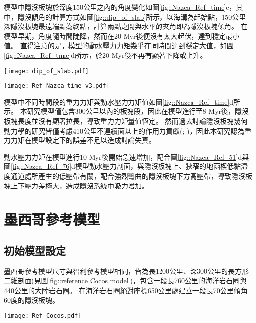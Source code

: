 模型中隱沒板塊於深度150公里之內的角度變化如圖\ref{fig::Nazca_Ref_time}c，其中，隱沒傾角的計算方式如圖\ref{fig::dip_of_slab}所示，以海溝為起始點，150公里深隱沒板塊最遠端點為終點，計算兩點之間與水平的夾角即為隱沒板塊傾角。
在模型早期，角度隨時間陡降，然而在20 Myr後便沒有太大起伏，達到穩定最小值。
直得注意的是，模型的動水壓力力矩幾乎在同時間達到穩定大值，如圖\ref{fig::Nazca_Ref_time}d所示，於20 Myr後不再有顯著下降或上升。

\begin{figure*}[h]
    \centering
    \texttt{[image: dip\_of\_slab.pdf]}
    \caption[本研究中隱沒傾角的計算方式]{本研究中隱沒傾角的計算方式。}
    \label{fig::dip_of_slab}
\end{figure*}

\begin{figure*}[ht!]
    \centering
    \texttt{[image: Ref\_Nazca\_time\_v3.pdf]}
    \caption[智利參考模型隱沒板塊狀態隨時間變化]{智利參考模型隱沒板塊狀態隨時間變化。灰底為模型中之平坦隱沒時期。(a)參考模型平坦段長度隨時間變化(b)參考模型平坦段深度隨時間變化，灰虛線為\citealp{Manea2017}中提及之智利平坦隱沒平坦段深度約落在100公里深，淺藍色底框出95公里至105公里範圍。(c)參考模型隱沒板塊自海溝到深度150公里之傾角。(d)參考模型中重力力矩與吸力力矩隨時間變化。其中粉紅色線為重力力矩，深藍色線為吸力力矩。兩者皆有做1 Myr的移動平均。}
    \label{fig::Nazca_Ref_time}
\end{figure*}

模型中不同時間段的重力力矩與動水壓力力矩值如圖\ref{fig::Nazca_Ref_time}d所示。
本研究模型僅包含300公里以內的板塊段，因此在模型進行至8 Myr後，隱沒板塊長度並沒有顯著拉長，導致重力力矩量值恆定。
然而過去討論隱沒板塊幾何動力學的研究皆僅考慮410公里不連續面以上的作用力貢獻(\citealp{schellart2004quantifying}; \citealp{billen2008modeling})，因此本研究認為重力力矩在模型設定下的誤差不足以造成討論失真。

動水壓力力矩在模型進行10 Myr後開始急速增加，配合圖\ref{fig::Nazca_Ref_51}d與圖\ref{fig::Nazca_Ref_76}d模型動水壓力剖面，與隱沒板塊上、狹窄的地函楔低黏滯度通道處所產生的低壓帶有關，配合強烈彎曲的隱沒板塊下方高壓帶，導致隱沒板塊上下壓力差極大，造成隱沒系統中吸力增加。

\newpage
\section{墨西哥參考模型}
\subsection{初始模型設定}
墨西哥參考模型尺寸與智利參考模型相同，皆為長1200公里、深300公里的長方形二維剖面(見圖\ref{fig::reference Cocos model})，包含一段長760公里的海洋岩石圈與440公里的大陸岩石圈。
在海洋岩石圈絕對座標650公里處建立一段長70公里傾角60度的隱沒板塊。
\begin{figure*}[ht!]
    \centering
    \texttt{[image: Ref\_Cocos.pdf]}
    \caption[墨西哥參考模型設計與邊界條件示意圖]{墨西哥參考模型設計與邊界條件示意圖}
    \label{fig::reference Cocos model}
\end{figure*}

